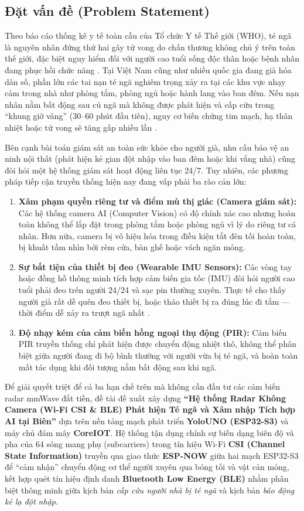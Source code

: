 \documentclass{hcmut-report}
\begin{document}
\subsection[Đặt vấn đề]{Đặt vấn đề (Problem Statement)}
Theo báo cáo thống kê y tế toàn cầu của Tổ chức Y tế Thế giới (WHO), té ngã là nguyên nhân đứng thứ hai gây tử vong do chấn thương không chủ ý trên toàn thế giới, đặc biệt nguy hiểm đối với người cao tuổi sống độc thân hoặc bệnh nhân đang phục hồi chức năng \cite{wang2017wifall}. Tại Việt Nam cũng như nhiều quốc gia đang già hóa dân số, phần lớn các tai nạn té ngã nghiêm trọng xảy ra tại các khu vực nhạy cảm trong nhà như phòng tắm, phòng ngủ hoặc hành lang vào ban đêm. Nếu nạn nhân nằm bất động sau cú ngã mà không được phát hiện và cấp cứu trong ``khung giờ vàng'' (30--60 phút đầu tiên), nguy cơ biến chứng tim mạch, hạ thân nhiệt hoặc tử vong sẽ tăng gấp nhiều lần \cite{palipana2018falldefi}.

Bên cạnh bài toán giám sát an toàn sức khỏe cho người già, nhu cầu bảo vệ an ninh nội thất (phát hiện kẻ gian đột nhập vào ban đêm hoặc khi vắng nhà) cũng đòi hỏi một hệ thống giám sát hoạt động liên tục 24/7. Tuy nhiên, các phương pháp tiếp cận truyền thống hiện nay đang vấp phải ba rào cản lớn:
\begin{enumerate}
  \item \textbf{Xâm phạm quyền riêng tư và điểm mù thị giác (Camera giám sát):} Các hệ thống camera AI (Computer Vision) có độ chính xác cao nhưng hoàn toàn không thể lắp đặt trong phòng tắm hoặc phòng ngủ vì lý do riêng tư cá nhân. Hơn nữa, camera bị vô hiệu hóa trong điều kiện tắt đèn tối hoàn toàn, bị khuất tầm nhìn bởi rèm cửa, bàn ghế hoặc vách ngăn mỏng.
  \item \textbf{Sự bất tiện của thiết bị đeo (Wearable IMU Sensors):} Các vòng tay hoặc đồng hồ thông minh tích hợp cảm biến gia tốc (IMU) đòi hỏi người cao tuổi phải đeo trên người 24/24 và sạc pin thường xuyên. Thực tế cho thấy người già rất dễ quên đeo thiết bị, hoặc tháo thiết bị ra đúng lúc đi tắm --- thời điểm dễ xảy ra trượt ngã nhất \cite{halperin2011tool}.
  \item \textbf{Độ nhạy kém của cảm biến hồng ngoại thụ động (PIR):} Cảm biến PIR truyền thống chỉ phát hiện được chuyển động nhiệt thô, không thể phân biệt giữa người đang đi bộ bình thường với người vừa bị té ngã, và hoàn toàn mất tác dụng khi đối tượng nằm bất động sau khi ngã.
\end{enumerate}

Để giải quyết triệt để cả ba hạn chế trên mà không cần đầu tư các cảm biến radar mmWave đắt tiền, đề tài đề xuất xây dựng \textbf{``Hệ thống Radar Không Camera (Wi-Fi CSI \& BLE) Phát hiện Té ngã và Xâm nhập Tích hợp AI tại Biên''} dựa trên nền tảng mạch phát triển \textbf{YoloUNO (ESP32-S3)} và máy chủ đám mây \textbf{CoreIOT}. Hệ thống tận dụng chính sự biến dạng biên độ và pha của 64 sóng mang phụ (subcarriers) trong tín hiệu Wi-Fi \textbf{CSI (Channel State Information)} truyền qua giao thức \textbf{ESP-NOW} giữa hai mạch ESP32-S3 để ``cảm nhận'' chuyển động cơ thể người xuyên qua bóng tối và vật cản mỏng, kết hợp quét tín hiệu định danh \textbf{Bluetooth Low Energy (BLE)} nhằm phân biệt thông minh giữa kịch bản \textit{cấp cứu người nhà bị té ngã} và kịch bản \textit{báo động kẻ lạ đột nhập}.
\end{document}

